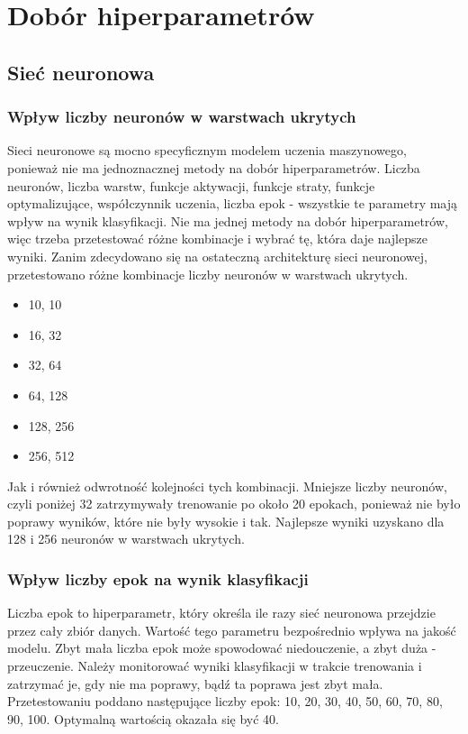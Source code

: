\section{Dobór hiperparametrów}\label{sec:dobor_hiperparametrow}
\subsection{Sieć neuronowa}\label{subsec:dobor_hiperparametrow_siec_neuronowa}
\subsubsection{Wpływ liczby neuronów w warstwach ukrytych}\label{subsubsec:liczba_neuronow}
Sieci neuronowe są mocno specyficznym modelem uczenia maszynowego, ponieważ nie ma jednoznacznej metody na dobór hiperparametrów.
Liczba neuronów, liczba warstw, funkcje aktywacji, funkcje straty, funkcje optymalizujące, współczynnik uczenia, liczba epok - wszystkie te parametry mają wpływ na wynik klasyfikacji.
Nie ma jednej metody na dobór hiperparametrów, więc trzeba przetestować różne kombinacje i wybrać tę, która daje najlepsze wyniki.
Zanim zdecydowano się na ostateczną architekturę sieci neuronowej, przetestowano różne kombinacje liczby neuronów w warstwach ukrytych.
\begin{itemize}
    \item 10, 10
    \item 16, 32
    \item 32, 64
    \item 64, 128
    \item 128, 256
    \item 256, 512
\end{itemize}
Jak i również odwrotność kolejności tych kombinacji. Mniejsze liczby neuronów, czyli poniżej 32 zatrzymywały trenowanie po około 20 epokach, ponieważ nie było poprawy wyników, które nie były wysokie i tak.
Najlepsze wyniki uzyskano dla 128 i 256 neuronów w warstwach ukrytych.
\subsubsection{Wpływ liczby epok na wynik klasyfikacji}\label{subsubsec:liczba_epok}
Liczba epok to hiperparametr, który określa ile razy sieć neuronowa przejdzie przez cały zbiór danych. Wartość tego parametru bezpośrednio wpływa na jakość modelu.
Zbyt mała liczba epok może spowodować niedouczenie, a zbyt duża - przeuczenie. Należy monitorować wyniki klasyfikacji w trakcie trenowania i zatrzymać je, gdy nie ma poprawy, bądź ta poprawa jest zbyt mała.
Przetestowaniu poddano następujące liczby epok: 10, 20, 30, 40, 50, 60, 70, 80, 90, 100.
Optymalną wartością okazała się być 40.
